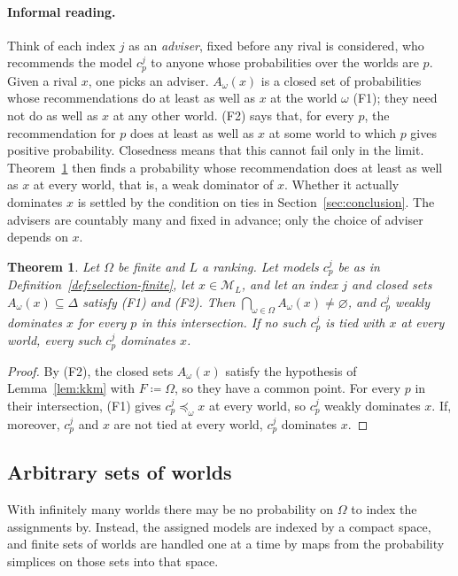 \documentclass[11pt]{article}
\newtheorem{theorem}{Theorem}[section]
\theoremstyle{definition}
\theoremstyle{remark}
\newcommand{\M}{\mathcal M}
\begin{document}
\paragraph{Informal reading.} Think of each index $j$ as an \emph{adviser}, fixed before any rival is considered, who recommends the model $c^j_p$ to anyone whose probabilities over the worlds are $p$. Given a rival $x$, one picks an adviser. $A_\omega(x)$ is a closed set of probabilities whose recommendations do at least as well as $x$ at the world $\omega$ (F1); they need not do as well as $x$ at any other world. (F2) says that, for every $p$, the recommendation for $p$ does at least as well as $x$ at some world to which $p$ gives positive probability. Closedness means that this cannot fail only in the limit. Theorem~\ref{thm:finite} then finds a probability whose recommendation does at least as well as $x$ at every world, that is, a weak dominator of $x$. Whether it actually dominates $x$ is settled by the condition on ties in Section~\ref{sec:conclusion}. The advisers are countably many and fixed in advance; only the choice of adviser depends on $x$.

\begin{theorem}\label{thm:finite}
Let $\Omega$ be finite and $L$ a ranking. Let models $c^j_p$ be as in Definition~\ref{def:selection-finite}, let $x\in\M_L$, and let an index $j$ and closed sets $A_\omega(x)\subseteq\Delta$ satisfy (F1) and (F2). Then $\bigcap_{\omega\in\Omega}A_\omega(x)\ne\varnothing$, and $c^j_p$ weakly dominates $x$ for every $p$ in this intersection. If no such $c^j_p$ is tied with $x$ at every world, every such $c^j_p$ dominates $x$.
\end{theorem}
\begin{proof}
By (F2), the closed sets $A_\omega(x)$ satisfy the hypothesis of Lemma~\ref{lem:kkm} with $F\coloneqq\Omega$, so they have a common point. For every $p$ in their intersection, (F1) gives $c^j_p\preceq_\omega x$ at every world, so $c^j_p$ weakly dominates $x$. If, moreover, $c^j_p$ and $x$ are not tied at every world, $c^j_p$ dominates $x$.
\end{proof}
\endgroup

\subsection{Arbitrary sets of worlds}

{\color{red}With infinitely many worlds there may be no probability on $\Omega$ to index the assignments by. Instead, the assigned models are indexed by a compact space, and finite sets of worlds are handled one at a time by maps from the probability simplices on those sets into that space.}
\end{document}
